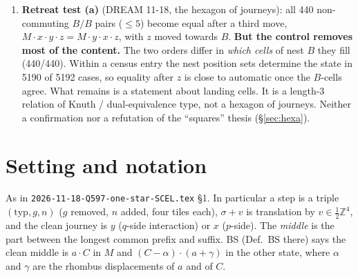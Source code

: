 \documentclass[11pt]{article}
\theoremstyle{definition}\newtheorem{definition}[theorem]{Definition}\newtheorem{remark}[theorem]{Remark}
\begin{document}
\begin{enumerate}
(iv) BS $\Leftrightarrow$ crossing translation at candidate level (CT) (Theorem~\ref{thm:ct}).
Computed: CT 521/521. Every candidate tile on the crossing lies in $x$'s wake or was made by $y$, never in the untouched board (521/521).
The crossing middle is always $a\cdot b\cdot w\cdot b$ with $w$ a run of type-a steps, and every nonempty run is a rigid translate of a block of $x$'s own journey (256/256): the two rhombi share a track.
\item \textbf{Retreat test (a)} (DREAM 11-18, the hexagon of journeys): all 440 non-commuting $B/B$ pairs ($\le5$) become equal after a third move, $M\cdot x\cdot y\cdot z=M\cdot y\cdot x\cdot z$, with $z$ moved towards $B$. \textbf{But the control removes most of the content.}
The two orders differ in \emph{which cells} of nest $B$ they fill (440/440). Within a census entry the nest position sets determine the state in 5190 of 5192 cases, so equality after $z$ is close to automatic once the $B$-cells agree.
What remains is a statement about landing cells. It is a length-3 relation of Knuth / dual-equivalence type, not a hexagon of journeys. Neither a confirmation nor a refutation of the ``squares'' thesis (\S\ref{sec:hexa}).
\end{enumerate}

\section{Setting and notation}
As in \texttt{2026-11-18-Q597-one-star-SCEL.tex} \S1. In particular a step is a triple $(\mathrm{typ},g,n)$ ($g$ removed, $n$ added, four tiles each), $\sigma+v$ is translation by $v\in\tfrac12\mathbb Z^4$,
and the clean journey is $y$ ($q$-side interaction) or $x$ ($p$-side). The \emph{middle} is the part between the longest common prefix and suffix. BS (Def.~BS there) says the clean middle is $a\cdot C$ in $M$ and
$(C-\alpha)\cdot(a+\gamma)$ in the other state, where $\alpha$ and $\gamma$ are the rhombus displacements of $a$ and of $C$.
\end{document}
